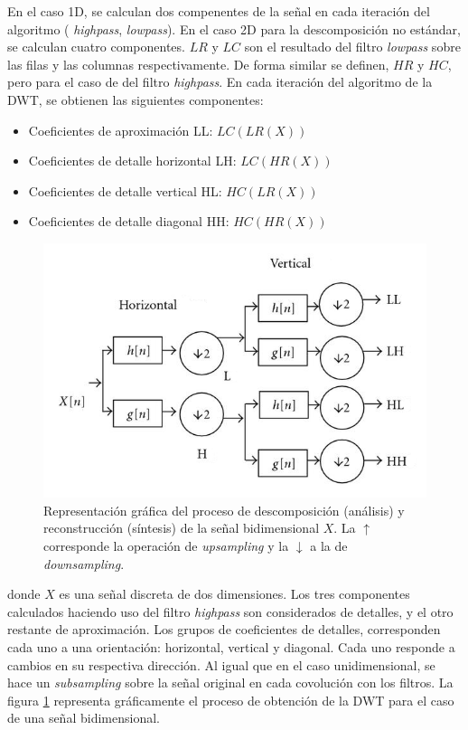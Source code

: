 En el caso 1D, se calculan dos compenentes de la señal en cada iteración del algoritmo ( \textit{highpass},
\textit{lowpass}). En el caso 2D para la descomposición no estándar, se calculan cuatro componentes. $LR$ y $LC$ son el resultado del filtro \textit{lowpass} 
sobre las filas y las columnas respectivamente. De forma similar se definen, $HR$ y $HC$, pero para el caso de
del filtro \textit{highpass}. En cada iteración del algoritmo de la DWT, se obtienen las siguientes componentes:

\begin{itemize}
	\item Coeficientes de aproximación LL: $LC(LR(X))$
	\item Coeficientes de detalle horizontal LH: $LC(HR(X))$
	\item Coeficientes de detalle vertical HL: $HC(LR(X))$ 
	\item Coeficientes de detalle diagonal HH: $HC(HR(X))$
\end{itemize}

\begin{figure}
	\begin{center}
		\includegraphics[scale=2]{Graphics/dwt-2D.png}
		\caption{Representación gráfica del proceso de descomposición (análisis) y reconstrucción (síntesis) de la señal bidimensional $X$. La $\uparrow$ corresponde la operación de \textit{upsampling} y la $\downarrow$ a la de \textit{downsampling}. }\label{fig:dwt-2D}
	\end{center}
\end{figure}

\noindent donde $X$ es una señal discreta de dos dimensiones. Los tres componentes calculados haciendo uso del 
filtro \textit{highpass} son considerados de detalles, y el otro restante de aproximación. Los grupos de coeficientes de
detalles, corresponden cada uno a una orientación: horizontal, vertical y diagonal. Cada uno responde a cambios en su
respectiva dirección. Al igual que en el caso unidimensional, se hace un \textit{subsampling} sobre la señal original
en cada covolución con los filtros. La figura \ref{fig:dwt-2D} representa gráficamente
el proceso de obtención de la DWT para el caso de una señal bidimensional.

